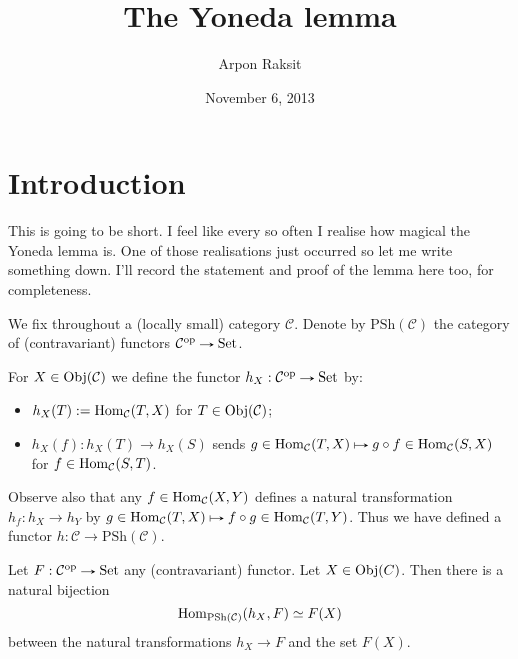 

\title{The Yoneda lemma}
\author{Arpon Raksit}
\date{November 6, 2013}



\maketitle
\thispagestyle{fancy}


\newcommand{\C}{\mathcal{C}}
\newcommand{\Set}{\mathrm{Set}}
\newcommand{\PSh}{\mathrm{PSh}}

\section{Introduction}

This is going to be short. I feel like every so often I realise how
magical the Yoneda lemma is. One of those realisations just occurred
so let me write something down. I'll record the statement and proof of
the lemma here too, for completeness.

\begin{notation}
  We fix throughout a (locally small) category $\C$. Denote by
  $\PSh(\C)$ the category of (contravariant) functors $\C^{\op} \to
  \Set$.
\end{notation}

\begin{definition}
  For $X \in \Obj(\C)$ we define the functor $h_X : \C^{\op} \to \Set$
  by:
  \begin{itemize}
  \item $h_X(T) \ce \Hom_\C(T,X)$ for $T \in \Obj(\C)$;
  \item $h_X(f) : h_X(T) \to h_X(S)$ sends $g \in \Hom_\C(T,X) \mapsto
    g \circ f \in \Hom_\C(S,X)$ for $f \in \Hom_\C(S,T)$.
  \end{itemize}
  Observe also that any $f \in \Hom_\C(X,Y)$ defines a natural
  transformation $h_f : h_X \to h_Y$ by $g \in \Hom_\C(T,X) \mapsto f
  \circ g \in \Hom_\C(T,Y)$. Thus we have defined a functor $h : \C
  \to \PSh(\C)$.
\end{definition}

\begin{lemma}[Yoneda]
  Let $F : \C^{\op} \to \Set$ any (contravariant) functor. Let $X \in
  \operatorname{Obj}(C)$. Then there is a natural bijection
  \[
  \Hom_{\PSh(\C)}(h_X,F) \simeq F(X)
  \]
  between the natural transformations $h_X \to F$ and the set $F(X)$.
\end{lemma}

